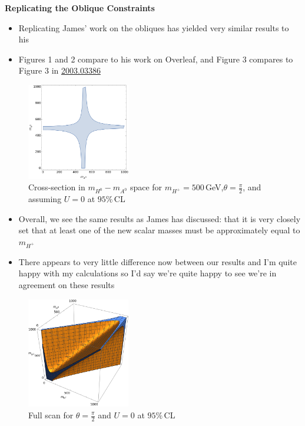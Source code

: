 \documentclass[11pt]{article}
\begin{document}
\thispagestyle{fancy}
{\Large\bfseries Replicating the Oblique Constraints}

\begin{itemize}
    \item Replicating James' work on the obliques has yielded very similar results to his
    \item Figures 1 and 2 compare to his work on Overleaf, and Figure 3 compares to Figure 3 in \href{https://arxiv.org/pdf/2003.03386.pdf}{2003.03386} 
\end{itemize}
\begin{figure}[h]
    \centering
    \includegraphics[width=0.4\textwidth]{oblique2D.png}
    \caption{Cross-section in $m_{H^0}-m_{A^0}$ space for $m_{H^+}=500\,$GeV,$\theta=\frac{\pi}{2}$, and assuming $U=0$ at $95\%\,$CL}
\end{figure}
\begin{itemize}
    \item Overall, we see the same results as James has discussed: that it is very closely set that at least one of the new scalar masses must be approximately equal to $m_{H^+}$
    \item There appears to very little difference now between our results and I'm quite happy with my calculations so I'd say we're quite happy to see we're in agreement on these results
\end{itemize}
\begin{figure}[h]
    \centering
    \includegraphics[width=0.4\textwidth]{oblique3D.png}
    \caption{Full scan for $\theta=\frac{\pi}{2}$ and $U=0$ at $95\%\,$CL}
\end{figure}
\end{document}
